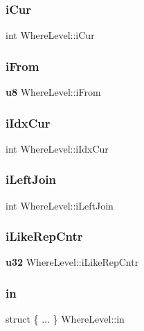 \subsubsection{iCur}
{\footnotesize\ttfamily int Where\+Level\+::i\+Cur}

\mbox{\label{struct_where_level_a4d8e905640b12a5075ff5e2f395876dd}} 
\subsubsection{iFrom}
{\footnotesize\ttfamily \textbf{ u8} Where\+Level\+::i\+From}

\mbox{\label{struct_where_level_a0733f34c7987c721351ab0001d4b1dd9}} 
\subsubsection{iIdxCur}
{\footnotesize\ttfamily int Where\+Level\+::i\+Idx\+Cur}

\mbox{\label{struct_where_level_a600072864f71c568cabcbb6140f6955a}} 
\subsubsection{iLeftJoin}
{\footnotesize\ttfamily int Where\+Level\+::i\+Left\+Join}

\mbox{\label{struct_where_level_ae1e65eb45261ec73581714758d9b73ac}} 
\subsubsection{iLikeRepCntr}
{\footnotesize\ttfamily \textbf{ u32} Where\+Level\+::i\+Like\+Rep\+Cntr}

\mbox{\label{struct_where_level_aedb67a49896b1d91bc5960ed46f1eead}} 
\subsubsection{in}
{\footnotesize\ttfamily struct \{ ... \}   Where\+Level\+::in}

\mbox{\label{struct_where_level_aa31c27c3304de936a6ce974450c55592}} 
